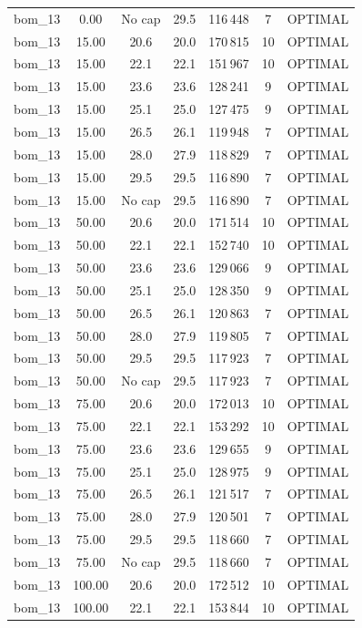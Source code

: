 \begin{longtable}{lcccccc}
bom\_13 & 0.00 & No cap & 29.5 & 116\,448 & 7 & OPTIMAL \\
bom\_13 & 15.00 & 20.6 & 20.0 & 170\,815 & 10 & OPTIMAL \\
bom\_13 & 15.00 & 22.1 & 22.1 & 151\,967 & 10 & OPTIMAL \\
bom\_13 & 15.00 & 23.6 & 23.6 & 128\,241 & 9 & OPTIMAL \\
bom\_13 & 15.00 & 25.1 & 25.0 & 127\,475 & 9 & OPTIMAL \\
bom\_13 & 15.00 & 26.5 & 26.1 & 119\,948 & 7 & OPTIMAL \\
bom\_13 & 15.00 & 28.0 & 27.9 & 118\,829 & 7 & OPTIMAL \\
bom\_13 & 15.00 & 29.5 & 29.5 & 116\,890 & 7 & OPTIMAL \\
bom\_13 & 15.00 & No cap & 29.5 & 116\,890 & 7 & OPTIMAL \\
bom\_13 & 50.00 & 20.6 & 20.0 & 171\,514 & 10 & OPTIMAL \\
bom\_13 & 50.00 & 22.1 & 22.1 & 152\,740 & 10 & OPTIMAL \\
bom\_13 & 50.00 & 23.6 & 23.6 & 129\,066 & 9 & OPTIMAL \\
bom\_13 & 50.00 & 25.1 & 25.0 & 128\,350 & 9 & OPTIMAL \\
bom\_13 & 50.00 & 26.5 & 26.1 & 120\,863 & 7 & OPTIMAL \\
bom\_13 & 50.00 & 28.0 & 27.9 & 119\,805 & 7 & OPTIMAL \\
bom\_13 & 50.00 & 29.5 & 29.5 & 117\,923 & 7 & OPTIMAL \\
bom\_13 & 50.00 & No cap & 29.5 & 117\,923 & 7 & OPTIMAL \\
bom\_13 & 75.00 & 20.6 & 20.0 & 172\,013 & 10 & OPTIMAL \\
bom\_13 & 75.00 & 22.1 & 22.1 & 153\,292 & 10 & OPTIMAL \\
bom\_13 & 75.00 & 23.6 & 23.6 & 129\,655 & 9 & OPTIMAL \\
bom\_13 & 75.00 & 25.1 & 25.0 & 128\,975 & 9 & OPTIMAL \\
bom\_13 & 75.00 & 26.5 & 26.1 & 121\,517 & 7 & OPTIMAL \\
bom\_13 & 75.00 & 28.0 & 27.9 & 120\,501 & 7 & OPTIMAL \\
bom\_13 & 75.00 & 29.5 & 29.5 & 118\,660 & 7 & OPTIMAL \\
bom\_13 & 75.00 & No cap & 29.5 & 118\,660 & 7 & OPTIMAL \\
bom\_13 & 100.00 & 20.6 & 20.0 & 172\,512 & 10 & OPTIMAL \\
bom\_13 & 100.00 & 22.1 & 22.1 & 153\,844 & 10 & OPTIMAL \\

\end{longtable}
